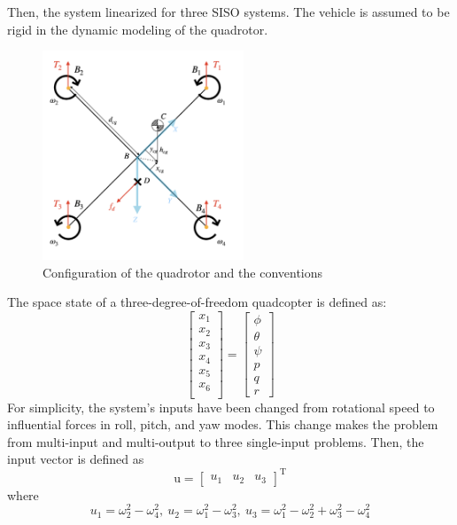 \documentclass[conference]{IEEEtran}
\begin{document}
Then, the system linearized for three SISO systems. The vehicle is assumed to be rigid in the dynamic modeling of the quadrotor.
\begin{figure}[htbp]
	\includegraphics[width=6cm]{../Figures/Forces/StandAssumations.png}
	\centering
	\caption{Configuration of the quadrotor and the conventions}
	\label{QuadAssum}
\end{figure}
The space state of a three-degree-of-freedom quadcopter is defined as:
\begin{equation}
	\begin{bmatrix}
		x_1\\x_2\\x_3\\x_4\\x_5\\x_6\\
	\end{bmatrix} = 
\begin{bmatrix}
	\phi\\ \theta \\ \psi \\ p\\ q\\ r
\end{bmatrix}
\end{equation}
For simplicity, the system's inputs have been changed from rotational speed to influential forces in roll, pitch, and yaw modes. This change makes the problem from multi-input and multi-output to three single-input problems.
Then, the input vector is defined as
\begin{equation}
	\boldsymbol{\mathrm{u}} = \begin{bmatrix}
		u_1&u_2&u_3
	\end{bmatrix}^\mathrm{T}
\end{equation}
where 
\begin{equation}\label{SISO_force}
	u_1 = \omega_2^2 - \omega_4^2, ~
	u_2 = \omega_1^2 - \omega_3^2, ~
	u_3 = \omega_1^2 - \omega_2^2  + \omega_3^2 - \omega_4^2
\end{equation}
\end{document}
